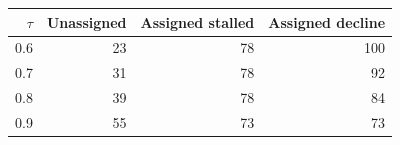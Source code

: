\begin{tabular}{rrrr}
\toprule
$\tau$ & Unassigned & Assigned stalled & Assigned decline \\
\midrule
0.6 & 23 & 78 & 100 \\
0.7 & 31 & 78 & 92 \\
0.8 & 39 & 78 & 84 \\
0.9 & 55 & 73 & 73 \\
\bottomrule
\end{tabular}
